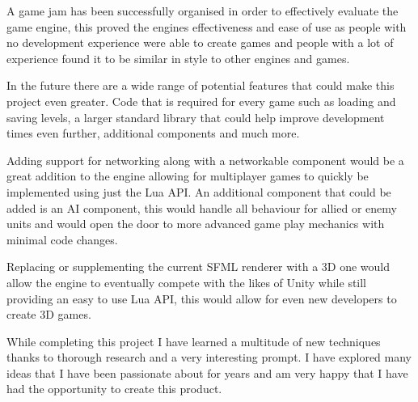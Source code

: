 \documentclass[11pt,a4paper,titlepage]{report}
\begin{document}
	A game jam has been successfully organised in order to effectively evaluate the game engine, this proved the engines effectiveness and ease of use as people with no development experience were able to create games and people with a lot of experience found it to be similar in style to other engines and games. 


	In the future there are a wide range of potential features that could make this project even greater. Code that is required for every game such as loading and saving levels, a larger standard library that could help improve development times even further, additional components and much more.

	Adding support for networking along with a networkable component would be a great addition to the engine allowing for multiplayer games to quickly be implemented using just the Lua API. An additional component that could be added is an AI component, this would handle all behaviour for allied or enemy units and would open the door to more advanced game play mechanics with minimal code changes.

	Replacing or supplementing the current SFML renderer with a 3D one would allow the engine to eventually compete with the likes of Unity while still providing an easy to use Lua API, this would allow for even new developers to create 3D games.

	While completing this project I have learned a multitude of new techniques thanks to thorough research and a very interesting prompt. I have explored many ideas that I have been passionate about for years and am very happy that I have had the opportunity to create this product.

	\newpage

	\singlespacing
	\printbibliography{}
	\onehalfspacing

\appendix








\end{document}
